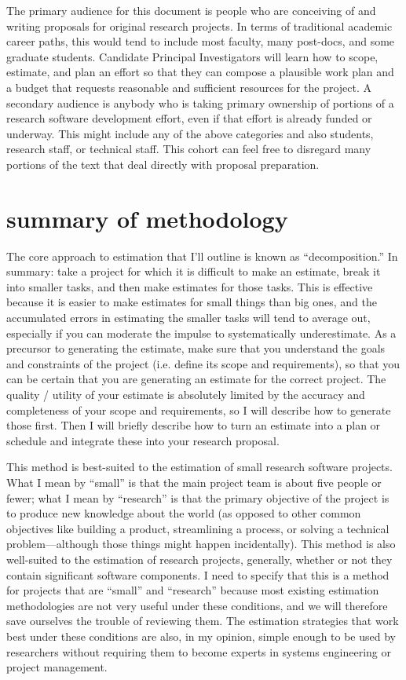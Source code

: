 \documentclass[12pt,oneside]{book}
\begin{document}
The primary audience for this document is people who are conceiving of and writing proposals for original research projects. In terms of traditional academic career paths, this would tend to include most faculty, many post-docs, and some graduate students. Candidate Principal Investigators will learn how to scope, estimate, and plan an effort so that they can compose a plausible work plan and a budget that requests reasonable and sufficient resources for the project. A secondary audience is anybody who is taking primary ownership of portions of a research software development effort, even if that effort is already funded or underway. This might include any of the above categories and also students, research staff, or technical staff. This cohort can feel free to disregard many portions of the text that deal directly with proposal preparation.

\newpage
{}
\section*{summary of methodology}

The core approach to estimation that I'll outline is known as ``decomposition.'' In summary: take a project for which it is difficult to make an estimate, break it into smaller tasks, and then make estimates for those tasks. This is effective because it is easier to make estimates for small things than big ones, and the accumulated errors in estimating the smaller tasks will tend to average out, especially if you can moderate the impulse to systematically underestimate. As a precursor to generating the estimate, make sure that you understand the goals and constraints of the project (i.e. define its scope and requirements), so that you can be certain that you are generating an estimate for the correct project. The quality / utility of your estimate is absolutely limited by the accuracy and completeness of your scope and requirements, so I will describe how to generate those first. Then I will briefly describe how to turn an estimate into a plan or schedule and integrate these into your research proposal.

This method is best-suited to the estimation of small research software projects. What I mean by ``small'' is that the main project team is about five people or fewer; what I mean by ``research'' is that the primary objective of the project is to produce new knowledge about the world (as opposed to other common objectives like building a product, streamlining a process, or solving a technical problem---although those things might happen incidentally). This method is also well-suited to the estimation of research projects, generally, whether or not they contain significant software components. I need to specify that this is a method for projects that are ``small'' and ``research'' because most existing estimation methodologies are not very useful under these conditions, and we will therefore save ourselves the trouble of reviewing them. The estimation strategies that work best under these conditions are also, in my opinion, simple enough to be used by researchers without requiring them to become experts in systems engineering or project management.
\end{document}
